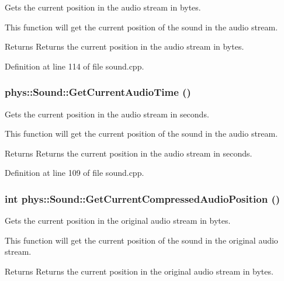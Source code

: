 Gets the current position in the audio stream in bytes. 

This function will get the current position of the sound in the audio stream. \begin{DoxyReturn}{Returns}
Returns the current position in the audio stream in bytes. 
\end{DoxyReturn}


Definition at line 114 of file sound.cpp.

\hypertarget{classphys_1_1Sound_ace3c118ee42540be51dcf64940d4f1e0}{
\subsubsection[{GetCurrentAudioTime}]{ phys::Sound::GetCurrentAudioTime ()}}
\label{dc/d2f/classphys_1_1Sound_ace3c118ee42540be51dcf64940d4f1e0}


Gets the current position in the audio stream in seconds. 

This function will get the current position of the sound in the audio stream. \begin{DoxyReturn}{Returns}
Returns the current position in the audio stream in seconds. 
\end{DoxyReturn}


Definition at line 109 of file sound.cpp.

\hypertarget{classphys_1_1Sound_adbcd16d55670bc6d97a1ce9b3d22d90c}{
\subsubsection[{GetCurrentCompressedAudioPosition}]{\setlength{\rightskip}{0pt plus 5cm}int phys::Sound::GetCurrentCompressedAudioPosition ()}}
\label{dc/d2f/classphys_1_1Sound_adbcd16d55670bc6d97a1ce9b3d22d90c}


Gets the current position in the original audio stream in bytes. 

This function will get the current position of the sound in the original audio stream. \begin{DoxyReturn}{Returns}
Returns the current position in the original audio stream in bytes. 
\end{DoxyReturn}


